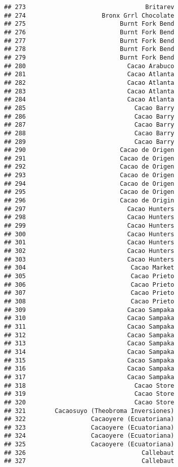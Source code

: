 \documentclass[
]{article}
\begin{document}
\begin{verbatim}
## 273                                 Britarev
## 274                     Bronx Grrl Chocolate
## 275                          Burnt Fork Bend
## 276                          Burnt Fork Bend
## 277                          Burnt Fork Bend
## 278                          Burnt Fork Bend
## 279                          Burnt Fork Bend
## 280                            Cacao Arabuco
## 281                            Cacao Atlanta
## 282                            Cacao Atlanta
## 283                            Cacao Atlanta
## 284                            Cacao Atlanta
## 285                              Cacao Barry
## 286                              Cacao Barry
## 287                              Cacao Barry
## 288                              Cacao Barry
## 289                              Cacao Barry
## 290                          Cacao de Origen
## 291                          Cacao de Origen
## 292                          Cacao de Origen
## 293                          Cacao de Origen
## 294                          Cacao de Origen
## 295                          Cacao de Origen
## 296                          Cacao de Origin
## 297                            Cacao Hunters
## 298                            Cacao Hunters
## 299                            Cacao Hunters
## 300                            Cacao Hunters
## 301                            Cacao Hunters
## 302                            Cacao Hunters
## 303                            Cacao Hunters
## 304                             Cacao Market
## 305                             Cacao Prieto
## 306                             Cacao Prieto
## 307                             Cacao Prieto
## 308                             Cacao Prieto
## 309                            Cacao Sampaka
## 310                            Cacao Sampaka
## 311                            Cacao Sampaka
## 312                            Cacao Sampaka
## 313                            Cacao Sampaka
## 314                            Cacao Sampaka
## 315                            Cacao Sampaka
## 316                            Cacao Sampaka
## 317                            Cacao Sampaka
## 318                              Cacao Store
## 319                              Cacao Store
## 320                              Cacao Store
## 321        Cacaosuyo (Theobroma Inversiones)
## 322                  Cacaoyere (Ecuatoriana)
## 323                  Cacaoyere (Ecuatoriana)
## 324                  Cacaoyere (Ecuatoriana)
## 325                  Cacaoyere (Ecuatoriana)
## 326                                Callebaut
## 327                                Callebaut

\end{verbatim}
\end{document}
